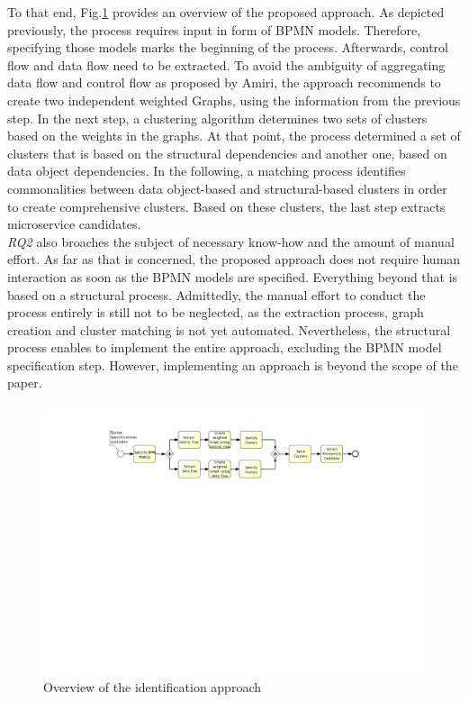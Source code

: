 \endgroup
\vspace{0.5cm}



\noindent
To that end, Fig.\ref{fig:thesisProcess} provides an overview of the proposed approach. As depicted previously, the process requires input in form of BPMN models. Therefore, specifying those models marks the beginning of the process. Afterwards, control flow and data flow need to be extracted. To avoid the ambiguity of aggregating data flow and control flow as proposed by Amiri, the approach recommends to create two independent weighted Graphs, using the information from the previous step. In the next step, a clustering algorithm determines two sets of clusters based on the weights in the graphs. At that point, the process determined a set of clusters that is based on the structural dependencies and another one, based on data object dependencies. In the following, a matching process identifies commonalities between data object-based and structural-based clusters in order to create comprehensive clusters. Based on these clusters, the last step extracts microservice candidates. \\
\textit{RQ2} also broaches the subject of necessary know-how and the amount of manual effort. As far as that is concerned, the proposed approach does not require human interaction as soon as the BPMN models are specified. Everything beyond that is based on a structural process.
Admittedly, the manual effort to conduct the process entirely is still not to be neglected, as the extraction process, graph creation and cluster matching is not yet automated. Nevertheless, the structural process enables to implement the entire approach, excluding the BPMN model specification step. However, implementing an approach is beyond the scope of the paper.




 
\begin{figure}[h!]
	\includegraphics[width=\textwidth, trim={7.5cm 15.3cm 5.0cm 1.5cm}]{img/ThesisProcess.pdf}
	\caption{Overview of the identification approach}
	\label{fig:thesisProcess}
\end{figure}






